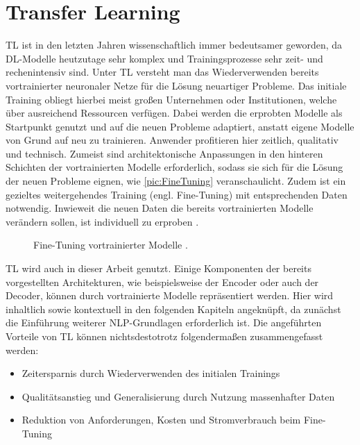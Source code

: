 \section{Transfer Learning}
\noindent
\ac{TL} ist in den letzten Jahren wissenschaftlich immer bedeutsamer geworden, da \ac{DL}-Modelle heutzutage sehr komplex und Trainingsprozesse sehr zeit- und rechenintensiv sind. Unter \ac{TL} versteht man das Wiederverwenden bereits vortrainierter neuronaler Netze für die Lösung neuartiger Probleme. Das initiale Training obliegt hierbei meist großen Unternehmen oder Institutionen, welche über ausreichend Ressourcen verfügen. Dabei werden die erprobten Modelle als Startpunkt genutzt und auf die neuen Probleme adaptiert, anstatt eigene Modelle von Grund auf neu zu trainieren. Anwender profitieren hier zeitlich, qualitativ und technisch. Zumeist sind architektonische Anpassungen in den hinteren Schichten der vortrainierten Modelle erforderlich, sodass sie sich für die Lösung der neuen Probleme eignen, wie \autoref{pic:FineTuning} veranschaulicht. Zudem ist ein gezieltes weitergehendes Training (engl. Fine-Tuning) mit entsprechenden Daten notwendig. Inwieweit die neuen Daten die bereits vortrainierten Modelle verändern sollen, ist individuell zu erproben \cite[S.~319,~534]{GOO16}.\\

\begin{figure}[h]
  \centering
  \caption{Fine-Tuning vortrainierter Modelle \cite[S.~555]{ZHA20}.}
  \label{pic:FineTuning}
\end{figure}
\newpage

\noindent
\ac{TL} wird auch in dieser Arbeit genutzt. Einige Komponenten der bereits vorgestellten Architekturen, wie beispielsweise der Encoder oder auch der Decoder, können durch vortrainierte Modelle repräsentiert werden. Hier wird inhaltlich sowie kontextuell in den folgenden Kapiteln angeknüpft, da zunächst die Einführung weiterer \ac{NLP}-Grundlagen erforderlich ist. Die angeführten Vorteile von \ac{TL} können nichtsdestotrotz folgendermaßen zusammengefasst werden:

\begin{itemize}
	\item Zeitersparnis durch Wiederverwenden des initialen Trainings
	\item Qualitätsanstieg und Generalisierung durch Nutzung massenhafter Daten
	\item Reduktion von Anforderungen, Kosten und Stromverbrauch beim Fine-Tuning
\end{itemize}
